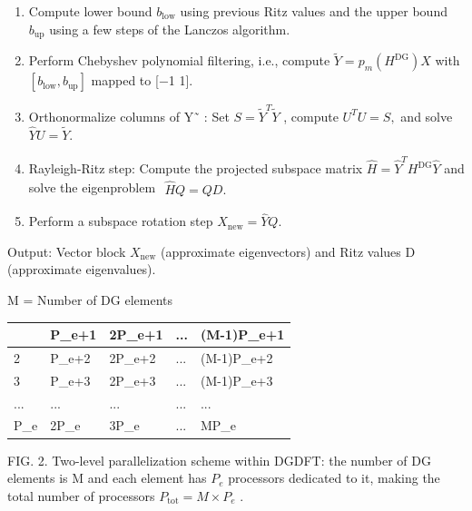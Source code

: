 \documentclass[
  10
]{article}
\newcounter{none} %
\begin{document}
\begin{enumerate}
\def\labelenumi{\arabic{enumi}.}
\item
  Compute lower bound \(b _ { \mathrm { l o w } }\) using previous Ritz
  values and the upper bound \(b _ { \mathrm { u p } }\) using a few
  steps of the Lanczos algorithm.
\item
  Perform Chebyshev polynomial filtering, i.e., compute
  \(\tilde { Y } = p _ { m } ( H ^ { \mathrm { D G } } ) X\) with
  \([ b _ { \mathrm { l o w } } , b _ { \mathrm { u p } } ]\) mapped to
  {[}−1 1{]}.
\item
  Orthonormalize columns of Y˜ : Set
  \(S = \tilde { Y } ^ { T } \tilde { Y }\) , compute
  \(U ^ { T } U = S ,\) and solve
  \({ \hat { Y } } U = { \tilde { Y } } .\)
\item
  Rayleigh-Ritz step: Compute the projected subspace matrix
  \(\hat { H } = \hat { Y } ^ { T } H ^ { \mathrm { D G } } \hat { Y }\)
  and solve the eigenproblem
  \(\begin{array} { r } { \hat { H } Q = Q D . } \end{array}\)
\item
  Perform a subspace rotation step
  \(X _ { \mathrm { n e w } } = { \hat { Y } } Q .\)
\end{enumerate}

Output: Vector block \(X _ { \mathrm { n e w } }\) (approximate
eigenvectors) and Ritz values D (approximate eigenvalues).

M = Number of DG elements

{\def\LTcaptype{none} %
\begin{longtable}[]{@{}|l|l|l|l|l|@{}}
\toprule\noalign{}
\endhead
\bottomrule\noalign{}
\endlastfoot
\hline
1 & P\_e+1 & 2P\_e+1 & ... & (M-1)P\_e+1 \\
\hline
2 & P\_e+2 & 2P\_e+2 & ... & (M-1)P\_e+2 \\
\hline
3 & P\_e+3 & 2P\_e+3 & ... & (M-1)P\_e+3 \\
\hline
... & ... & ... & ... & ... \\
\hline
P\_e & 2P\_e & 3P\_e & ... & MP\_e \\
\hline
\end{longtable}
}

FIG. 2. Two-level parallelization scheme within DGDFT: the number of DG
elements is M and each element has \(P _ { e }\) processors dedicated to
it, making the total number of processors
\(P _ { \mathrm { t o t } } = M \times P _ { e }\) .
\end{document}
